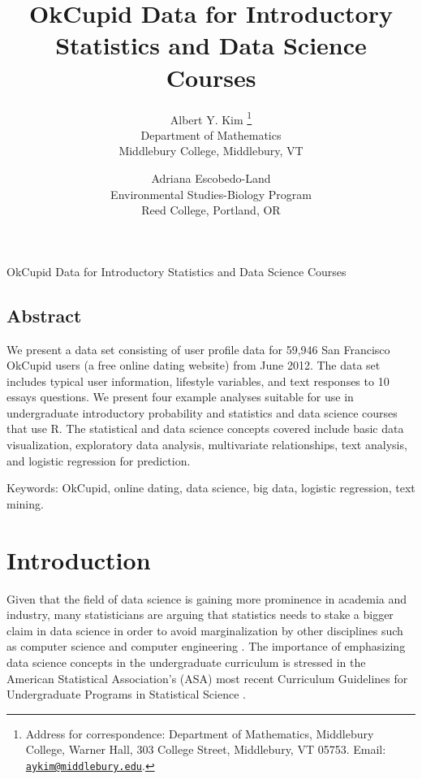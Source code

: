\documentclass{article}
\begin{document}
\title{OkCupid Data for Introductory Statistics and Data Science Courses}
\author{
\normalsize Albert Y. Kim \thanks{
  Address for correspondence: Department of Mathematics,
  Middlebury College, Warner Hall,
  303 College Street,
  Middlebury, VT 05753.
  Email: \href{mailto:aykim@middlebury.edu}{\nolinkurl{aykim@middlebury.edu}}.
  }\\
\footnotesize Department of Mathematics\\
\footnotesize Middlebury College, Middlebury, VT \\
\and
\normalsize Adriana Escobedo-Land \\
\footnotesize Environmental Studies-Biology Program\\
\footnotesize Reed College, Portland, OR\\
\normalsize
}

\maketitle

\newpage
\begin{center}
{\Large OkCupid Data for Introductory Statistics and Data Science Courses}
\end{center}
\subsection*{Abstract}
We present a data set consisting of user profile data for 59,946 San Francisco OkCupid users (a free online dating website) from June 2012.  The data set includes typical user information, lifestyle variables, and text responses to 10 essays questions.  We present four example analyses suitable for use in undergraduate introductory probability and statistics and data science courses that use R.  The statistical and data science concepts covered include basic data visualization, exploratory data analysis, multivariate relationships, text analysis, and logistic regression for prediction.

\vspace{.1in}

Keywords:  OkCupid, online dating, data science, big data, logistic regression, text mining.
\newpage




%
\section{Introduction}\label{intro}
%
Given that the field of data science is gaining more prominence in academia and industry, many statisticians are arguing that statistics needs to stake a bigger claim in data science in order to avoid marginalization by other disciplines such as computer science and computer engineering \citep{DAVIDSON:2014,YU:2014}.  The importance of emphasizing data science concepts in the undergraduate curriculum is stressed in the American Statistical Association's (ASA) most recent Curriculum Guidelines for Undergraduate Programs in Statistical Science \citep{ASA:Guidelines}.
\end{document}
